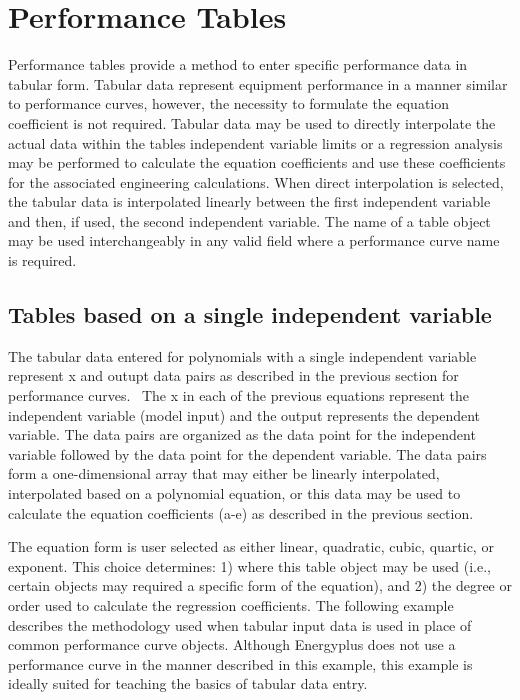 \section{Performance Tables}\label{performance-tables}

Performance tables provide a method to enter specific performance data in tabular form. Tabular data represent equipment performance in a manner similar to performance curves, however, the necessity to formulate the equation coefficient is not required. Tabular data may be used to directly interpolate the actual data within the tables independent variable limits or a regression analysis may be performed to calculate the equation coefficients and use these coefficients for the associated engineering calculations. When direct interpolation is selected, the tabular data is interpolated linearly between the first independent variable and then, if used, the second independent variable. The name of a table object may be used interchangeably in any valid field where a performance curve name is required.

\subsection{Tables based on a single independent variable}\label{tables-based-on-a-single-independent-variable}

The tabular data entered for polynomials with a single independent variable represent x and outupt data pairs as described in the previous section for performance curves.~ The x in each of the previous equations represent the independent variable (model input) and the output represents the dependent variable. The data pairs are organized as the data point for the independent variable followed by the data point for the dependent variable. The data pairs form a one-dimensional array that may either be linearly interpolated, interpolated based on a polynomial equation, or this data may be used to calculate the equation coefficients (a-e) as described in the previous section.

The equation form is user selected as either linear, quadratic, cubic, quartic, or exponent. This choice determines: 1) where this table object may be used (i.e., certain objects may required a specific form of the equation), and 2) the degree or order used to calculate the regression coefficients. The following example describes the methodology used when tabular input data is used in place of common performance curve objects. Although Energyplus does not use a performance curve in the manner described in this example, this example is ideally suited for teaching the basics of tabular data entry.

